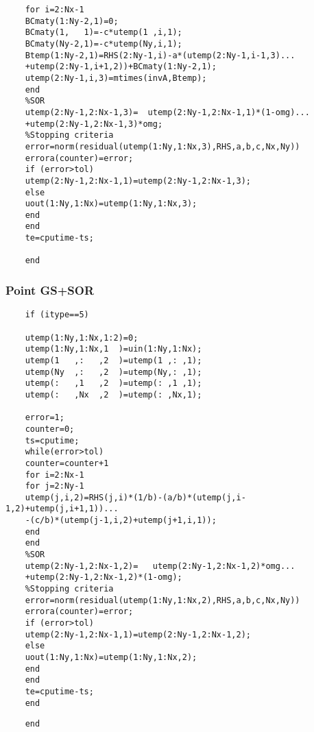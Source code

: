 \documentclass[11pt]{report}
\begin{document}
\begin{appendices}
\begin{enumerate}
\begin{verbatim}
	for i=2:Nx-1
	BCmaty(1:Ny-2,1)=0;
	BCmaty(1,   1)=-c*utemp(1 ,i,1);
	BCmaty(Ny-2,1)=-c*utemp(Ny,i,1);
	Btemp(1:Ny-2,1)=RHS(2:Ny-1,i)-a*(utemp(2:Ny-1,i-1,3)...
	+utemp(2:Ny-1,i+1,2))+BCmaty(1:Ny-2,1);
	utemp(2:Ny-1,i,3)=mtimes(invA,Btemp);
	end
	%SOR
	utemp(2:Ny-1,2:Nx-1,3)=  utemp(2:Ny-1,2:Nx-1,1)*(1-omg)...
	+utemp(2:Ny-1,2:Nx-1,3)*omg;
	%Stopping criteria
	error=norm(residual(utemp(1:Ny,1:Nx,3),RHS,a,b,c,Nx,Ny))
	errora(counter)=error;
	if (error>tol)
	utemp(2:Ny-1,2:Nx-1,1)=utemp(2:Ny-1,2:Nx-1,3);
	else
	uout(1:Ny,1:Nx)=utemp(1:Ny,1:Nx,3);
	end
	end
	te=cputime-ts;
	
	end
	\end{verbatim}
	
	
	
	
	\subsubsection*{Point GS+SOR}
	
	\begin{verbatim}
	if (itype==5)
	
	utemp(1:Ny,1:Nx,1:2)=0;
	utemp(1:Ny,1:Nx,1  )=uin(1:Ny,1:Nx);
	utemp(1   ,:   ,2  )=utemp(1 ,: ,1);
	utemp(Ny  ,:   ,2  )=utemp(Ny,: ,1);
	utemp(:   ,1   ,2  )=utemp(: ,1 ,1);
	utemp(:   ,Nx  ,2  )=utemp(: ,Nx,1);
	
	error=1;
	counter=0;
	ts=cputime;
	while(error>tol)
	counter=counter+1
	for i=2:Nx-1
	for j=2:Ny-1
	utemp(j,i,2)=RHS(j,i)*(1/b)-(a/b)*(utemp(j,i-1,2)+utemp(j,i+1,1))...
	-(c/b)*(utemp(j-1,i,2)+utemp(j+1,i,1));
	end
	end
	%SOR
	utemp(2:Ny-1,2:Nx-1,2)=   utemp(2:Ny-1,2:Nx-1,2)*omg...
	+utemp(2:Ny-1,2:Nx-1,2)*(1-omg);
	%Stopping criteria
	error=norm(residual(utemp(1:Ny,1:Nx,2),RHS,a,b,c,Nx,Ny))
	errora(counter)=error;
	if (error>tol)
	utemp(2:Ny-1,2:Nx-1,1)=utemp(2:Ny-1,2:Nx-1,2);
	else
	uout(1:Ny,1:Nx)=utemp(1:Ny,1:Nx,2);
	end
	end
	te=cputime-ts;
	end
	\end{verbatim}
	\begin{verbatim}
	end
	\end{verbatim}
	
\end{enumerate}
\end{appendices}
\end{document}
